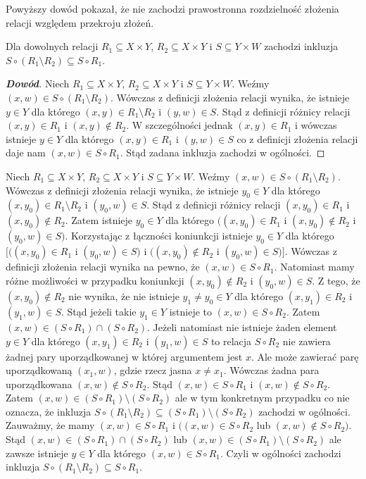 \begin{remark}
Powyższy dowód pokazał, że nie zachodzi prawostronna rozdzielność złożenia relacji względem przekroju złożeń.
\end{remark}
\begin{property}
Dla dowolnych relacji $R_{1}\subseteq X\times Y$, $R_{2}\subseteq X\times Y$ i $S\subseteq Y\times W$ zachodzi inkluzja
$S\circ(R_{1}\setminus R_{2})\subseteq S\circ R_{1}$.
\end{property}
\begin{proof}[\textbf{Dowód}]
Niech $R_{1}\subseteq X\times Y$, $R_{2}\subseteq X\times Y$ i $S\subseteq Y\times W$. Weźmy $(x,w)\in S\circ(R_{1}\setminus R_{2})$. Wówczas z definicji złożenia relacji wynika, że istnieje $y\in Y$ dla którego $(x,y)\in R_{1}\setminus R_{2}$ i $(y,w)\in S$. Stąd z definicji różnicy relacji $(x,y)\in R_{1}$ i $(x,y)\notin R_{2}$. W szczególności jednak $(x,y)\in R_{1}$ i wówczas istnieje $y\in Y$ dla którego $(x,y)\in R_{1}$ i $(y,w)\in S$ co z definicji złożenia relacji daje nam $(x,w)\in S\circ R_{1}$. Stąd zadana inkluzja zachodzi w ogólności.
\end{proof}
\begin{exercise}
Niech $R_{1}\subseteq X\times Y$, $R_{2}\subseteq X\times Y$ i $S\subseteq Y\times W$. Weźmy $(x,w)\in S\circ(R_{1}\setminus R_{2})$. Wówczas z definicji złożenia relacji wynika, że istnieje $y_{0}\in Y$ dla którego $(x,y_{0})\in R_{1}\setminus R_{2}$ i $(y_{0},w)\in S$. Stąd z definicji różnicy relacji $(x,y_{0})\in R_{1}$ i $(x,y_{0})\notin R_{2}$. Zatem istnieje $y_{0}\in Y$ dla którego $((x,y_{0})\in R_{1}$ i $(x,y_{0})\notin R_{2}$ i $(y_{0},w)\in S)$. Korzystając z łączności koniunkcji istnieje $y_{0}\in Y$ dla którego $[((x,y_{0})\in R_{1}$ i $(y_{0},w)\in S)$ i $((x,y_{0})\notin R_{2}$ i $(y_{0},w)\in S)]$. Wówczas z definicji złożenia relacji wynika na pewno, że $(x,w)\in S\circ R_{1}$. Natomiast mamy różne możliwości w przypadku koniunkcji $(x,y_{0})\notin R_{2}$ i $(y_{0},w)\in S$. Z tego, że $(x,y_{0})\notin R_{2}$ nie wynika, że nie istnieje $y_{1}\ne y_{0}\in Y$ dla którego $(x,y_{1})\in R_{2}$ i $(y_{1},w)\in S$. Stąd jeżeli takie $y_{1}\in Y$ istnieje to $(x,w)\in S\circ R_{2}$. Zatem $(x,w)\in(S\circ R_{1})\cap(S\circ R_{2})$. Jeżeli natomiast nie istnieje żaden element $y\in Y$ dla którego $(x,y_{1})\in R_{2}$ i $(y_{1},w)\in S$ to relacja $S\circ R_{2}$ nie zawiera żadnej pary uporządkowanej w której argumentem jest $x$. Ale może zawierać parę uporządkowaną $(x_{1},w)$, gdzie rzecz jasna $x\ne x_{1}$. Wówczas żadna para uporządkowana $(x,w)\notin S\circ R_{2}$. Stąd $(x,w)\in S\circ R_{1}$ i $(x,w)\notin S\circ R_{2}$. Zatem $(x,w)\in(S\circ R_{1})\setminus(S\circ R_{2})$ ale w tym konkretnym przypadku co nie oznacza, że inkluzja $S\circ(R_{1}\setminus R_{2})\subseteq(S\circ R_{1})\setminus(S\circ R_{2})$ zachodzi w ogólności.
Zauważmy, że mamy $(x,w)\in S\circ R_{1}$ i $((x,w)\in S\circ R_{2}$ lub $(x,w)\notin S\circ R_{2})$. Stąd $(x,w)\in(S\circ R_{1})\cap(S\circ R_{2})$ lub $(x,w)\in(S\circ R_{1})\setminus(S\circ R_{2})$ ale zawsze istnieje $y\in Y$ dla którego $(x,w)\in S\circ R_{1}$. Czyli w ogólności zachodzi inkluzja $S\circ(R_{1}\setminus R_{2})\subseteq S\circ R_{1}$.
\end{exercise}

